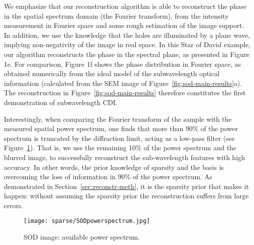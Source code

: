 We emphasize that our reconstruction algorithm is able to reconstruct
the phase in the spatial spectrum domain (the Fourier transform), from
the intensity measurement in Fourier space and some rough estimation
of the image support. In addition, we use the knowledge that the holes
are illuminated by a plane wave, implying non-negativity of the image
in real space. In this Star of David example, our algorithm
reconstructs the phase in the spectral plane, as presented in Figure
1e. For comparison, Figure 1f shows the phase distribution in Fourier
space, as obtained numerically from the ideal model of the
subwavelength optical information (calculated from the SEM image of
Figure~\ref{fig:sod-main-results}a). The reconstruction in
Figure~\ref{fig:sod-main-results} therefore constitutes the first
demonstration of subwavelength CDI.

Interestingly, when comparing the Fourier transform of the sample with
the measured spatial power spectrum, one finds that more than 90\% of
the power spectrum is truncated by the diffraction limit, acting as a
low-pass filter (see Figure~\ref{fig:sod-powerspectrum}).  That is, we
use the remaining 10\% of the power spectrum and the blurred image, to
successfully reconstruct the sub-wavelength features with high
accuracy. In other words, the prior knowledge of sparsity and the
basis is overcoming the loss of information in 90\% of the power
spectrum. As demonstrated in Section~\ref{sec:reconstr-meth}, it is
the sparsity prior that makes it happen: without assuming the sparsity
prior the reconstruction suffers from large errors.
\begin{figure}[H]
  \centering
  \texttt{[image: sparse/SODpowerspectrum.jpg]}
  \caption{SOD image: available power spectrum.}
  \label{fig:sod-powerspectrum}
\end{figure}


